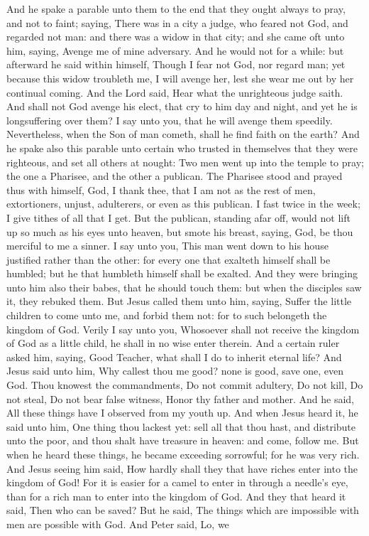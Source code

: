 And he spake a parable unto them to the end that they ought always to pray, and not to faint; saying, There was in a city a judge, who feared not God, and regarded not man: and there was a widow in that city; and she came oft unto him, saying, Avenge me of mine adversary. And he would not for a while: but afterward he said within himself, Though I fear not God, nor regard man; yet because this widow troubleth me, I will avenge her, lest she wear me out by her continual coming. And the Lord said, Hear what the unrighteous judge saith. And shall not God avenge his elect, that cry to him day and night, and yet he is longsuffering over them? I say unto you, that he will avenge them speedily. Nevertheless, when the Son of man cometh, shall he find faith on the earth?  And he spake also this parable unto certain who trusted in themselves that they were righteous, and set all others at nought: Two men went up into the temple to pray; the one a Pharisee, and the other a publican. The Pharisee stood and prayed thus with himself, God, I thank thee, that I am not as the rest of men, extortioners, unjust, adulterers, or even as this publican. I fast twice in the week; I give tithes of all that I get. But the publican, standing afar off, would not lift up so much as his eyes unto heaven, but smote his breast, saying, God, be thou merciful to me a sinner. I say unto you, This man went down to his house justified rather than the other: for every one that exalteth himself shall be humbled; but he that humbleth himself shall be exalted.  And they were bringing unto him also their babes, that he should touch them: but when the disciples saw it, they rebuked them. But Jesus called them unto him, saying, Suffer the little children to come unto me, and forbid them not: for to such belongeth the kingdom of God. Verily I say unto you, Whosoever shall not receive the kingdom of God as a little child, he shall in no wise enter therein.  And a certain ruler asked him, saying, Good Teacher, what shall I do to inherit eternal life? And Jesus said unto him, Why callest thou me good? none is good, save one, even God. Thou knowest the commandments, Do not commit adultery, Do not kill, Do not steal, Do not bear false witness, Honor thy father and mother. And he said, All these things have I observed from my youth up. And when Jesus heard it, he said unto him, One thing thou lackest yet: sell all that thou hast, and distribute unto the poor, and thou shalt have treasure in heaven: and come, follow me. But when he heard these things, he became exceeding sorrowful; for he was very rich. And Jesus seeing him said, How hardly shall they that have riches enter into the kingdom of God! For it is easier for a camel to enter in through a needle’s eye, than for a rich man to enter into the kingdom of God. And they that heard it said, Then who can be saved? But he said, The things which are impossible with men are possible with God. And Peter said, Lo, we 